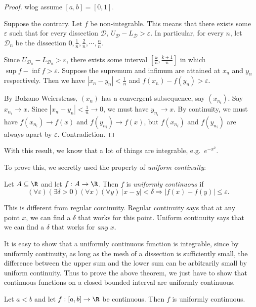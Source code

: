 \documentclass[a4paper]{article}
\begin{document}
\begin{proof}
  wlog assume $[a, b] = [0, 1]$.

  Suppose the contrary. Let $f$ be non-integrable. This means that there exists some $\varepsilon$ such that for every dissection $\mathcal{D}$, $U_{\mathcal{D}} - L_{\mathcal{D}} > \varepsilon$. In particular, for every $n$, let $\mathcal{D}_n$ be the dissection $0, \frac{1}{n}, \frac{2}{n}, \cdots, \frac{n}{n}$.

  Since $U_{\mathcal{D}_n} - L_{\mathcal{D}_n} > \varepsilon$, there exists some interval $\left[\frac{k}{n}, \frac{k + 1}{n}\right]$ in which $\sup f - \inf f > \varepsilon$. Suppose the supremum and infimum are attained at $x_n$ and $y_n$ respectively. Then we have $|x_n - y_n| < \frac{1}{n}$ and $f(x_n) - f(y_n) > \varepsilon$.

  By Bolzano Weierstrass, $(x_n)$ has a convergent subsequence, say $(x_{n_i})$. Say $x_{n_i}\to x$. Since $|x_n - y_n| < \frac{1}{n}\to 0$, we must have $y_{n_i}\to x$. By continuity, we must have $f(x_{n_i}) \to f(x)$ and $f(y_{n_i}) \to f(x)$, but $f(x_{n_i})$ and $f(y_{n_i})$ are always apart by $\varepsilon$. Contradiction.
\end{proof}
With this result, we know that a lot of things are integrable, e.g.\ $e^{-x^2}$.

To prove this, we secretly used the property of \emph{uniform continuity}:
\begin{defi}
  Let $A\subseteq \R$ and let $f: A\to \R$. Then $f$ is \emph{uniformly continuous} if
  \[
    (\forall \varepsilon)(\exists \delta > 0)(\forall x)(\forall y)\;|x - y| < \delta \Rightarrow |f(x) - f(y)| \leq \varepsilon.
  \]
\end{defi}
This is different from regular continuity. Regular continuity says that at any point $x$, we can find a $\delta$ that works for this point. Uniform continuity says that we can find a $\delta$ that works for \emph{any} $x$.

It is easy to show that a uniformly continuous function is integrable, since by uniformly continuity, as long as the mesh of a dissection is sufficiently small, the difference between the upper sum and the lower sum can be arbitrarily small by uniform continuity. Thus to prove the above theorem, we just have to show that continuous functions on a closed bounded interval are uniformly continuous.

\begin{thm}
  Let $a < b$ and let $f: [a, b] \to \R$ be continuous. Then $f$ is uniformly continuous.
\end{thm}
\end{document}
